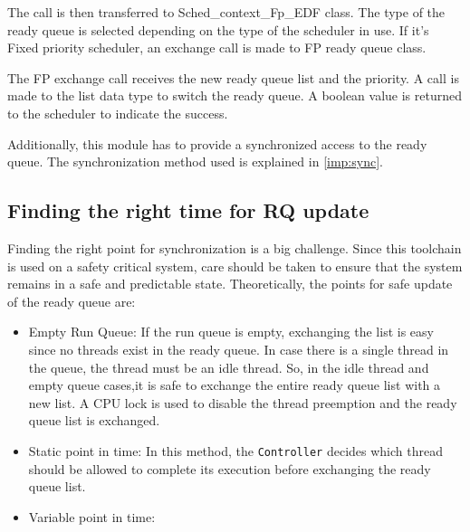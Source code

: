 The call is then transferred to Sched\_context\_Fp\_EDF class. The type of the ready queue is selected depending on the type of the scheduler in use. If it's Fixed priority scheduler, an exchange call is made to FP ready queue class. 

The FP exchange call receives the new ready queue list and the priority. A call is made to the list data type to switch the ready queue. A boolean value is returned to the scheduler to indicate the success.

Additionally, this module has to provide a synchronized access to the ready queue. The synchronization method used is explained in \ref{imp:sync}. 

\subsection{Finding the right time for RQ update}
Finding the right point for synchronization is a big challenge. Since this toolchain is used on a safety critical system, care should be taken to ensure that the system remains in a safe and predictable state. Theoretically, the points for safe update of the ready queue are:

\begin{itemize}
\item Empty Run Queue: If the run queue is empty, exchanging the list is easy since no threads exist in the ready queue. In case there is a single thread in the queue, the thread must be an idle thread. So, in the idle thread and empty queue cases,it is safe to exchange the entire ready queue list with a new list. A CPU lock is used to disable the thread preemption and the ready queue list is exchanged.

\item Static point in time: In this method, the \texttt{Controller} decides which thread should be allowed to complete its execution before exchanging the ready queue list. 

\item Variable point in time: 
\end{itemize}
